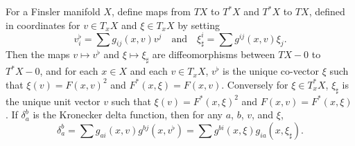 \begin{lemma} \label{lema:wdoijwadoiawjdlabel}
  For a Finsler manifold $X$, define maps from $TX$ to $T^*X$ and $T^* X$ to $TX$, defined in coordinates for $v \in T_x X$ and $\xi \in T_x X$ by setting
  \[ v^\flat_i = \sum g_{ij}(x,v) v^j \quad\text{and}\quad \xi_\sharp^i = \sum g^{ij}(x,v) \xi_j. \]
  Then the maps $v \mapsto v^\flat$ and $\xi \mapsto \xi_\sharp$ are diffeomorphisms between $TX - 0$ to $T^*X - 0$, and for each $x \in X$ and each $v \in T_x X$, $v^\flat$ is the unique co-vector $\xi$ such that $\xi(v) = F(x,v)^2$ and $F^*(x,\xi) = F(x,v)$. Conversely for $\xi \in T^*_x X$, $\xi_\sharp$ is the unique unit vector $v$ such that $\xi(v) = F^*(x,\xi)^2$ and $F(x,v) = F^*(x,\xi)$. If $\delta_a^b$ is the Kronecker delta function, then for any $a$, $b$, $v$, and $\xi$,
  \[ \delta_a^b = \sum g_{ai}(x,v) g^{bj}(x,v^\flat) = \sum g^{bi}(x,\xi) g_{ia}(x,\xi_\sharp). \]
\end{lemma}
